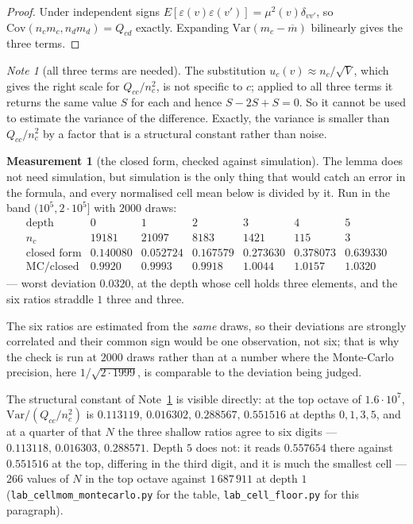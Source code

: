 \documentclass[11pt,a4paper]{article}
\theoremstyle{plain}
\theoremstyle{definition}
\newtheorem{measurement}[theorem]{Measurement}
\theoremstyle{remark}
\newtheorem{note}[theorem]{Note}
\begin{document}
\begin{proof}
Under independent signs
$E[\varepsilon(v)\varepsilon(v')]=\mu^2(v)\delta_{vv'}$, so
$\mathrm{Cov}(n_cm_c,n_dm_d)=Q_{cd}$ exactly. Expanding
$\mathrm{Var}(m_c-\overline m)$ bilinearly gives the three terms.
\end{proof}

\begin{note}[all three terms are needed]\label{note:threeterms}
The substitution $u_c(v)\approx n_c/\sqrt V$, which gives the right
scale for $Q_{cc}/n_c^2$, is not specific to $c$; applied to all three
terms it returns the same value $S$ for each and hence $S-2S+S=0$. So
it cannot be used to estimate the variance of the difference. Exactly,
the variance is smaller than $Q_{cc}/n_c^2$ by a factor that is a
structural constant rather than noise.
\end{note}

\begin{measurement}[the closed form, checked against simulation]%
\label{meas:mc}
The lemma does not need simulation, but simulation is the only thing
that would catch an error in the formula, and every normalised cell
mean below is divided by it. Run in the band $(10^5,2\cdot10^5]$ with
$2000$ draws:
\[
\begin{array}{r|cccccc}
 \text{depth} & 0 & 1 & 2 & 3 & 4 & 5\\
 n_c & 19181 & 21097 & 8183 & 1421 & 115 & 3\\\hline
 \text{closed form} & 0.140080 & 0.052724 & 0.167579 & 0.273630
   & 0.378073 & 0.639330\\
 \text{MC}/\text{closed} & 0.9920 & 0.9993
   & 0.9918 & 1.0044 & 1.0157 & 1.0320
\end{array}
\]
--- worst deviation $0.0320$, at the depth whose cell holds three
elements, and the six ratios straddle $1$ three and three.

The six ratios are estimated from the \emph{same} draws, so their
deviations are strongly correlated and their common sign would be one
observation, not six; that is why the check is run at $2000$ draws
rather than at a number where the Monte-Carlo precision, here
$1/\sqrt{2\cdot1999}$, is comparable to the deviation being judged.

The structural constant of Note~\ref{note:threeterms} is visible
directly: at the top octave of $1.6\cdot10^7$,
$\mathrm{Var}/(Q_{cc}/n_c^2)$ is
$0.113119,\,0.016302,\,0.288567,\,0.551516$ at depths $0,1,3,5$, and
at a quarter of that $N$ the three shallow ratios agree to six digits
--- $0.113118,\,0.016303,\,0.288571$. Depth $5$ does not: it reads
$0.557654$ there against $0.551516$ at the top, differing in the third
digit, and it is much the smallest cell --- $266$ values of $N$ in the
top octave against $1\,687\,911$ at depth $1$
(\texttt{lab\_cellmom\_montecarlo.py} for the table,
\texttt{lab\_cell\_floor.py} for this paragraph).
\end{measurement}
\end{document}
